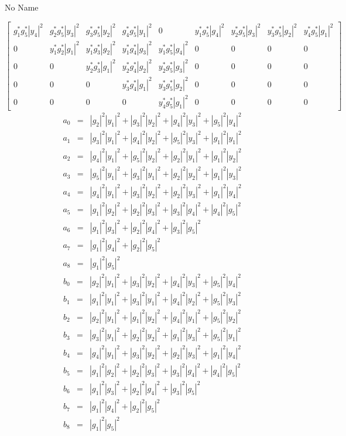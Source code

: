 \documentclass[a4paper,10pt]{article}
\begin{document}
\begin{section}{No Name}
\begin{landscape}
\begin{equation}
\begin{bmatrix}
g_1^*g_5^*|y_4|^2&g_2^*g_5^*|y_3|^2&g_3^*g_5^*|y_2|^2&g_4^*g_5^*|y_1|^2&0&y_1^*g_5^*|g_4|^2&y_2^*g_5^*|g_3|^2&y_3^*g_5^*|g_2|^2&y_4^*g_5^*|g_1|^2\\
0&y_1^*g_2^*|g_1|^2&y_1^*g_3^*|g_2|^2&y_1^*g_4^*|g_3|^2&y_1^*g_5^*|g_4|^2&0&0&0&0\\
0&0&y_2^*g_3^*|g_1|^2&y_2^*g_4^*|g_2|^2&y_2^*g_5^*|g_3|^2&0&0&0&0\\
0&0&0&y_3^*g_4^*|g_1|^2&y_3^*g_5^*|g_2|^2&0&0&0&0\\
0&0&0&0&y_4^*g_5^*|g_1|^2&0&0&0&0
\end{bmatrix}
\end{equation}
\begin{eqnarray}
a_{0} &=& |g_2|^2|y_1|^2 + |g_3|^2|y_2|^2 + |g_4|^2|y_3|^2 + |g_5|^2|y_4|^2\\
a_{1} &=& |g_3|^2|y_1|^2 + |g_4|^2|y_2|^2 + |g_5|^2|y_3|^2 + |g_1|^2|y_1|^2\\
a_{2} &=& |g_4|^2|y_1|^2 + |g_5|^2|y_2|^2 + |g_2|^2|y_1|^2 + |g_1|^2|y_2|^2\\
a_{3} &=& |g_5|^2|y_1|^2 + |g_3|^2|y_1|^2 + |g_2|^2|y_2|^2 + |g_1|^2|y_3|^2\\
a_{4} &=& |g_4|^2|y_1|^2 + |g_3|^2|y_2|^2 + |g_2|^2|y_3|^2 + |g_1|^2|y_4|^2\\
a_{5} &=& |g_1|^2|g_2|^2 + |g_2|^2|g_3|^2 + |g_3|^2|g_4|^2 + |g_4|^2|g_5|^2\\
a_{6} &=& |g_1|^2|g_3|^2 + |g_2|^2|g_4|^2 + |g_3|^2|g_5|^2\\
a_{7} &=& |g_1|^2|g_4|^2 + |g_2|^2|g_5|^2\\
a_{8} &=& |g_1|^2|g_5|^2
\end{eqnarray}
\begin{eqnarray}
b_{0} &=& |g_2|^2|y_1|^2 + |g_3|^2|y_2|^2 + |g_4|^2|y_3|^2 + |g_5|^2|y_4|^2\\
b_{1} &=& |g_1|^2|y_1|^2 + |g_3|^2|y_1|^2 + |g_4|^2|y_2|^2 + |g_5|^2|y_3|^2\\
b_{2} &=& |g_2|^2|y_1|^2 + |g_1|^2|y_2|^2 + |g_4|^2|y_1|^2 + |g_5|^2|y_2|^2\\
b_{3} &=& |g_3|^2|y_1|^2 + |g_2|^2|y_2|^2 + |g_1|^2|y_3|^2 + |g_5|^2|y_1|^2\\
b_{4} &=& |g_4|^2|y_1|^2 + |g_3|^2|y_2|^2 + |g_2|^2|y_3|^2 + |g_1|^2|y_4|^2\\
b_{5} &=& |g_1|^2|g_2|^2 + |g_2|^2|g_3|^2 + |g_3|^2|g_4|^2 + |g_4|^2|g_5|^2\\
b_{6} &=& |g_1|^2|g_3|^2 + |g_2|^2|g_4|^2 + |g_3|^2|g_5|^2\\
b_{7} &=& |g_1|^2|g_4|^2 + |g_2|^2|g_5|^2\\
b_{8} &=& |g_1|^2|g_5|^2
\end{eqnarray}
\end{landscape}


\end{section}
\end{document}
